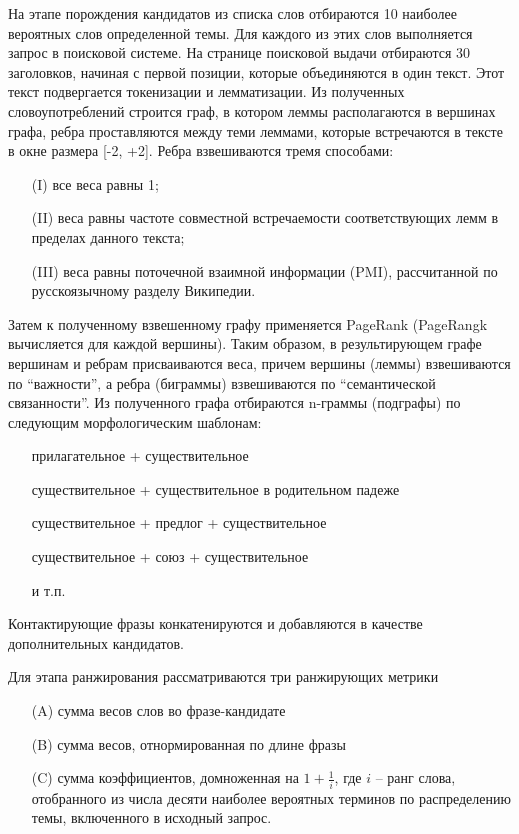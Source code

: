 На этапе порождения кандидатов из списка слов отбираются 10 наиболее вероятных слов определенной темы. Для каждого из этих слов выполняется запрос в поисковой системе. На странице поисковой выдачи отбираются 30 заголовков, начиная с первой позиции, которые объединяются в один текст. Этот текст подвергается токенизации и лемматизации. Из полученных словоупотреблений строится граф, в котором леммы располагаются в вершинах графа, ребра проставляются между теми леммами, которые встречаются в тексте в окне размера [-2, +2]. Ребра взвешиваются тремя способами: 
\begin{itemize}
    \item[(I)] все веса равны 1; 
    \item[(II)] веса равны частоте совместной встречаемости соответствующих лемм в пределах данного текста;
    \item[(III)] веса равны поточечной взаимной информации (PMI), рассчитанной по русскоязычному разделу Википедии.
\end{itemize} 
\noindent Затем к полученному взвешенному графу применяется PageRank (PageRangk вычисляется для каждой вершины). Таким образом, в результирующем графе вершинам и ребрам присваиваются веса, причем вершины (леммы) взвешиваются по ``важности'', а ребра (биграммы) взвешиваются по ``семантической связанности''. Из полученного графа отбираются n-граммы (подграфы) по следующим морфологическим шаблонам:
\begin{itemize}
    \item[] прилагательное + существительное
    \item[] существительное + существительное в родительном падеже
    \item[] существительное + предлог + существительное
    \item[] существительное + союз + существительное
    \item[] и т.п.
\end{itemize} 
Контактирующие фразы конкатенируются и добавляются в качестве дополнительных кандидатов.

Для этапа ранжирования рассматриваются три ранжирующих метрики
\begin{itemize}
    \item[(A)] сумма весов слов во фразе-кандидате  
    \item[(B)] сумма весов, отнормированная по длине фразы
    \item[(C)] сумма коэффициентов, домноженная на $1 + \frac{1}{i}$, где $i$ -- ранг слова, отобранного из числа десяти наиболее вероятных терминов по распределению темы, включенного в исходный запрос.
\end{itemize} 

